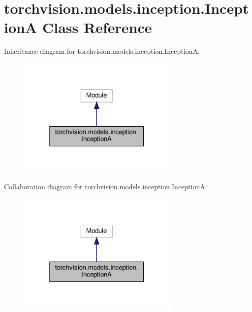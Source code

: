 \hypertarget{classtorchvision_1_1models_1_1inception_1_1InceptionA}{}\section{torchvision.\+models.\+inception.\+InceptionA Class Reference}
\label{classtorchvision_1_1models_1_1inception_1_1InceptionA}


Inheritance diagram for torchvision.\+models.\+inception.\+InceptionA\+:
\nopagebreak
\begin{figure}[H]
\begin{center}
\leavevmode
\includegraphics[width=223pt]{classtorchvision_1_1models_1_1inception_1_1InceptionA__inherit__graph}
\end{center}
\end{figure}


Collaboration diagram for torchvision.\+models.\+inception.\+InceptionA\+:
\nopagebreak
\begin{figure}[H]
\begin{center}
\leavevmode
\includegraphics[width=223pt]{classtorchvision_1_1models_1_1inception_1_1InceptionA__coll__graph}
\end{center}
\end{figure}
